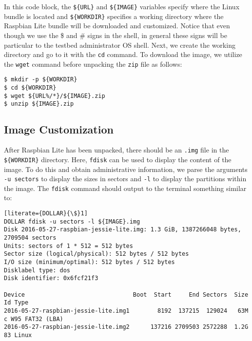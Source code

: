 In this code block, the \texttt{\$\{URL\}} and \texttt{\$\{IMAGE\}}
variables specify where the Linux bundle is located and
\texttt{\$\{WORKDIR\}} specifies a working directory where the Raspbian
Lite bundle will be downloaded and customized. Notice that even though we
use the \$ and \# signs in the shell, in general these signs will be
particular to the testbed administrator \ac{OS} shell. Next, we create
the working directory and go to it with the \texttt{cd} command. To
download the image, we utilize the \texttt{wget} command before unpacking
the \texttt{zip} file as follows:



\begin{lstlisting}[]
$ mkdir -p ${WORKDIR}
$ cd ${WORKDIR}
$ wget ${URL%/*}/${IMAGE}.zip
$ unzip ${IMAGE}.zip
\end{lstlisting}
\FloatBarrier
\vspace{-5mm}


\subsection{Image Customization}

After Raspbian Lite has been unpacked, there should be an \texttt{.img}
file in the \texttt{\$\{WORKDIR\}} directory. Here, \texttt{fdisk} can
be used to display the content of the image. To do this and obtain
administrative information, we parse the arguments \texttt{-u sectors}
to display the sizes in sectors and \texttt{-l} to display the partitions
within the image. The \texttt{fdisk} command should output to the terminal
something similar to:

\begin{lstlisting}[literate={DOLLAR}{\$}1]
DOLLAR fdisk -u sectors -l ${IMAGE}.img
Disk 2016-05-27-raspbian-jessie-lite.img: 1.3 GiB, 1387266048 bytes, 2709504 sectors
Units: sectors of 1 * 512 = 512 bytes
Sector size (logical/physical): 512 bytes / 512 bytes
I/O size (minimum/optimal): 512 bytes / 512 bytes
Disklabel type: dos
Disk identifier: 0x6fcf21f3

Device                               Boot  Start     End Sectors  Size Id Type
2016-05-27-raspbian-jessie-lite.img1        8192  137215  129024   63M  c W95 FAT32 (LBA)
2016-05-27-raspbian-jessie-lite.img2      137216 2709503 2572288  1.2G 83 Linux
\end{lstlisting}
\FloatBarrier

